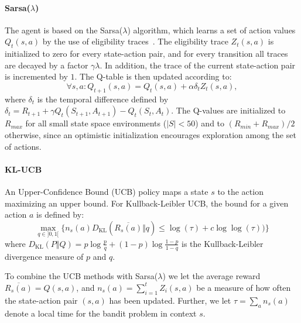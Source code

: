 
\paragraph{Sarsa($\lambda$)}
The agent is based on the Sarsa($\lambda$) algorithm, which learns a set of
action values $Q_t(s,a)$ by the use of eligibility
traces~\cite{Sutton:1998:IRL:551283}. The eligibility trace $Z_t(s,a)$ is
initialized to zero for every state-action pair, and for every transition all
traces are decayed by a factor $\gamma\lambda$. In addition, the trace of the
current state-action pair is incremented by $1$. The Q-table is then updated
according to:
\begin{equation}
        \forall s,a : Q_{t+1}(s,a) = Q_t(s,a) + \alpha\delta_t Z_t(s,a),
\end{equation}
where $\delta_t$ is the temporal difference defined by $\delta_t = R_{t+1} +
\gamma Q_t(S_{t+1},A_{t+1}) - Q_t(S_t,A_t)$. The Q-values are initialized to
$R_{max}$ for all small state space environments ($\vert{S}\vert < 50$) and to
$(R_{min}+R_{max})/2$ otherwise, since an optimistic initialization encourages
exploration among the set of actions.

\paragraph{KL-UCB}
An Upper-Confidence Bound (UCB) policy maps a state $s$ to the action maximizing
an upper bound. For Kullback-Leibler UCB, the bound for a given action $a$ is
defined by:
\begin{equation}
    \max_{q \in ]0,1[}\big\{n_s(a)
        D_{\mathrm{KL}}\left(\overline{R_s(a)}\Big\Vert{q}\right) \le \log(\tau) +
        c\log\log(\tau))\big\}
\end{equation}
where $D_\mathrm{KL}(P\Vert{Q}) = p \log \frac{p}{q}+(1-p)\log\frac{1-p}{1-q}$
is the Kullback-Leibler divergence measure of $p$ and
$q$.~\cite{DBLP:journals/jmlr/GarivierC11}

To combine the UCB methods with Sarsa($\lambda$) we let the average reward
$\overline{R_s(a)}=Q(s,a)$, and $n_s(a)=\sum_{i=1}^tZ_i(s,a)$ be a measure of
how often the state-action pair $(s,a)$ has been updated. Further, we let $\tau
= \sum_a{n_s(a)}$ denote a local time for the bandit problem in context $s$.



